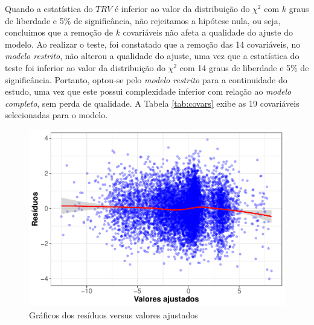 \documentclass[twocolumn]{rbef}
\newcommand{\1}{\mathbbm{1}}
\begin{document}
Quando a estatística do \(TRV\) é inferior ao valor da distribuição do \({\chi}^2\) com \(k\) graus de liberdade e 5\% de significância, não rejeitamos a hipótese nula, ou seja, concluimos que a remoção de \(k\) covariáveis não afeta a qualidade do ajuste do modelo. Ao realizar o teste, foi constatado que a remoção das 14 covariáveis, no \textit{modelo restrito}, não alterou a qualidade do ajuste, uma vez que a estatística do teste foi inferior ao valor da distribuição do \({\chi}^2\) com 14 graus de liberdade e 5\% de significância. Portanto, optou-se pelo \textit{modelo restrito} para a continuidade do estudo, uma vez que este possui complexidade inferior com relação ao \textit{modelo completo}, sem perda de qualidade. A Tabela \ref{tab:covars} exibe as 19 covariáveis selecionadas para o modelo.

\begin{figure}

{\centering \includegraphics[width=1\linewidth]{article_files/figure-latex/resplot-1} 

}

\caption{Gráficos dos resíduos versus valores ajustados}\label{fig:resplot}
\end{figure}
\end{document}
